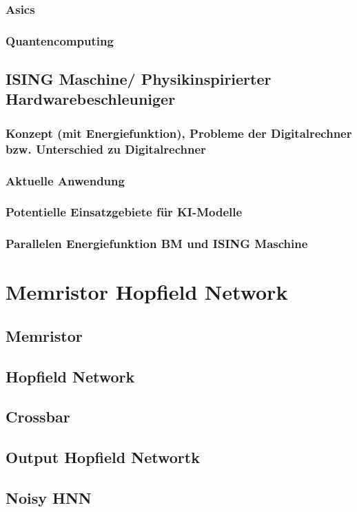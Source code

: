 \subsubsection{Asics}
\subsubsection{Quantencomputing}
\subsection{ISING Maschine/ Physikinspirierter Hardwarebeschleuniger}
\subsubsection{Konzept (mit Energiefunktion), Probleme der Digitalrechner bzw. Unterschied zu Digitalrechner}
\subsubsection{Aktuelle Anwendung}
\subsubsection{Potentielle Einsatzgebiete für KI-Modelle}
\subsubsection{Parallelen Energiefunktion BM und ISING Maschine}

\section{Memristor Hopfield Network}
\subsection{Memristor}
\subsection{Hopfield Network}
\subsection{Crossbar}
\subsection{Output Hopfield Networtk}
\subsection{Noisy HNN}
